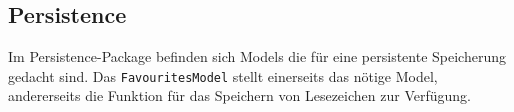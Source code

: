 
\subsection{Persistence}
Im Persistence-Package befinden sich Models die für eine persistente Speicherung gedacht sind. Das \lstinline|FavouritesModel| stellt einerseits das nötige Model, andererseits die Funktion für das Speichern von Lesezeichen zur Verfügung.
